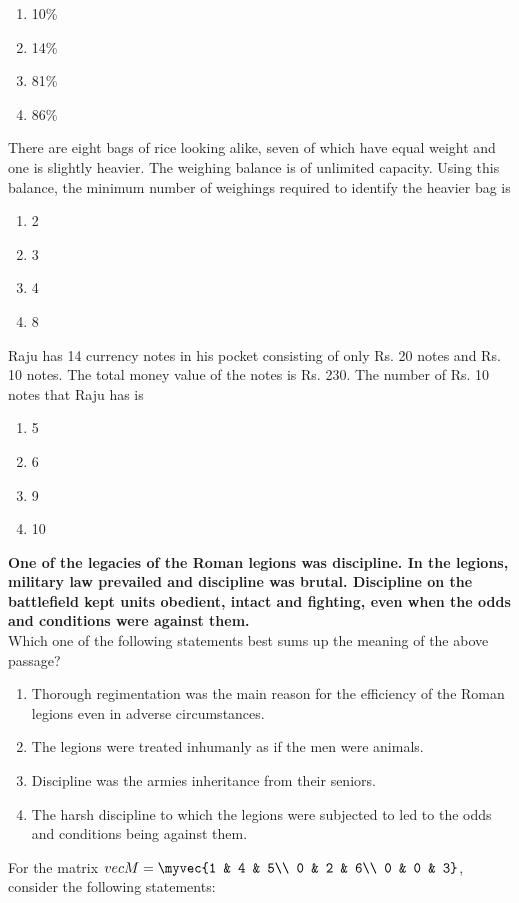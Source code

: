 		\begin{enumerate}
			\item 10\%
			\item 14\%
			\item 81\%
			\item 86\%
		\end{enumerate}
\item There are eight bags of rice looking alike, seven of which have equal weight and one is slightly heavier. The weighing balance is of unlimited capacity. Using this balance, the minimum number of weighings required to identify the heavier bag is
	\begin{enumerate}
		\item 2
		\item 3
		\item 4
		\item 8
	\end{enumerate}
\item Raju has 14 currency notes in his pocket consisting of only Rs. 20 notes and Rs. 10 notes. The total money value of the notes is Rs. 230. The number of Rs. 10 notes that Raju has is
	\begin{enumerate}
		\item 5
		\item 6
		\item 9
		\item 10
	\end{enumerate}
\item \textbf{One of the legacies of the Roman legions was discipline. In the legions, military law prevailed and discipline was brutal. Discipline on the battlefield kept units obedient, intact and fighting, even when the odds and conditions were against them.} \\
Which one of the following statements best sums up the meaning of the above passage?
\begin{enumerate}
	\item Thorough regimentation was the main reason for the efficiency of the Roman legions even in adverse circumstances.
	\item The legions were treated inhumanly as if the men were animals.
	\item Discipline was the armies inheritance from their seniors.
	\item The harsh discipline to which the legions were subjected to led to the odds and conditions being against them.
\end{enumerate}
\item For the matrix $vec{M} = \myvec{1 & 4 & 5\\
0 & 2 & 6\\
0 & 0 & 3}$, consider the following statements: \\
